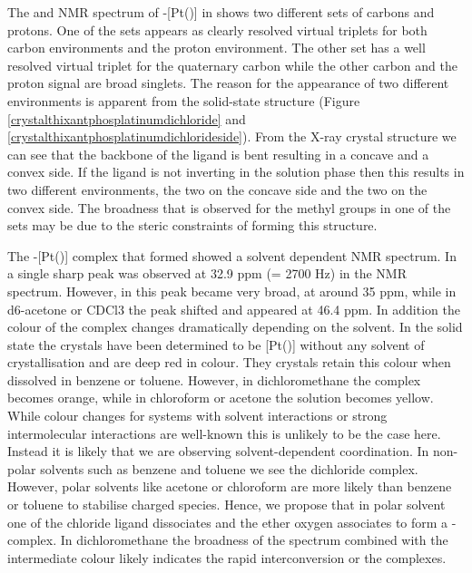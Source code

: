 The \proton{} and \carbon{} NMR spectrum of \trans-[Pt(\tButhixantphos)] in  shows two different sets of \tBu{} carbons and protons.  One of the sets appears as clearly resolved virtual triplets for both carbon environments and the proton environment.  The other set has a well resolved virtual triplet for the quaternary carbon while the other carbon and the proton signal are broad singlets.  The reason for the appearance of two different \tBu{} environments is apparent from the solid-state structure (Figure \ref{crystalthixantphosplatinumdichloride} and \ref{crystalthixantphosplatinumdichlorideside}).  From the X-ray crystal structure we can see that the backbone of the \tButhixantphos{} ligand is bent resulting in a concave and a convex side.  If the ligand is not inverting in the solution phase then this results in two different \tBu{} environments, the two on the concave side and the two on the convex side.  The broadness that is observed for the methyl groups in one of the sets may be due to the steric constraints of forming this structure.  

The \trans-[Pt(\tButhixantphos)] complex that formed showed a solvent dependent NMR spectrum.  In  a single sharp peak was observed at 32.9 ppm (\JPtP = 2700 Hz) in the \phosphorus{} NMR spectrum.  However, in  this peak became very broad, at around 35 ppm, while in d6-acetone  or CDCl3 the peak shifted and appeared at 46.4 ppm.  In addition the colour of the complex changes dramatically depending on the solvent.  In the solid state the crystals have been determined to be [Pt(\tButhixantphos)] without any solvent of crystallisation and are deep red in colour.  They crystals retain this colour when dissolved in benzene or toluene.  However, in dichloromethane the complex becomes orange, while in chloroform or acetone the solution becomes yellow.  While colour changes for systems with solvent interactions or strong intermolecular interactions are well-known this is unlikely to be the case here.  Instead it is likely that we are observing solvent-dependent coordination.  In non-polar solvents such as benzene and toluene we see the dichloride complex.  However, polar solvents like acetone or chloroform are more likely than benzene or toluene to stabilise charged species.  Hence, we propose that in polar solvent one of the chloride ligand dissociates and the ether oxygen associates to form a \POP-\tButhixantphos{} complex.  In dichloromethane the broadness of the spectrum combined with the intermediate colour likely indicates the rapid interconversion or the complexes.  

